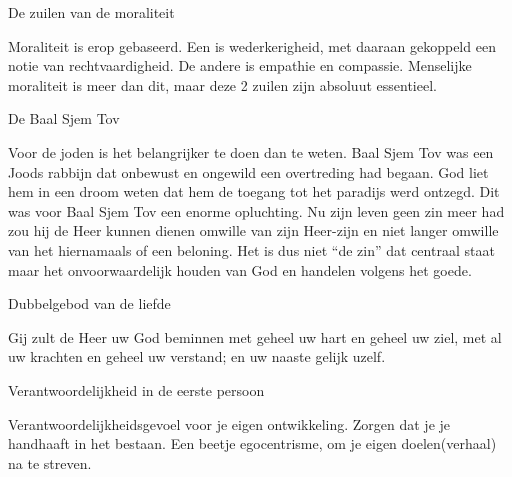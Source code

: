 \documentclass[main.tex]{subfiles}
\begin{document}
\begin{examenvraag}
    \begin{vraag}
        De zuilen van de moraliteit
    \end{vraag}

    \begin{antwoord}
		Moraliteit is erop gebaseerd.
		Een is wederkerigheid, met daaraan gekoppeld een notie van rechtvaardigheid. 
		De andere is empathie en compassie. 
		Menselijke moraliteit is meer dan dit, maar deze 2 zuilen zijn absoluut essentieel.
    \end{antwoord}
\end{examenvraag}


\begin{examenvraag}
    \begin{vraag}
        De Baal Sjem Tov
    \end{vraag}

    \begin{antwoord}
        Voor de joden is het belangrijker te doen dan te weten.‭ ‬Baal Sjem Tov was een Joods rabbijn 
        dat‭ ‬onbewust en ongewild een overtreding had begaan.‭ ‬God liet hem in een droom weten dat‭ 
        ‬hem de toegang tot het paradijs werd ontzegd.‭ ‬Dit was voor Baal Sjem Tov een enorme 
        opluchting.‭ ‬Nu zijn leven geen zin meer had zou hij de Heer kunnen dienen omwille van zijn 
        Heer-zijn en niet langer omwille van het hiernamaals of een beloning.‭ ‬Het is dus‭ ‬niet‭ “‬de 
        zin‭”‬ dat centraal staat maar het onvoorwaardelijk houden van God en handelen volgens het 
        goede.
    \end{antwoord}
\end{examenvraag}


\begin{examenvraag}
    \begin{vraag}
        Dubbelgebod van de liefde
    \end{vraag}

    \begin{antwoord}
        Gij zult de Heer uw God beminnen met geheel uw hart en geheel uw ziel, 
        met al uw krachten en geheel uw verstand; 
        en uw naaste gelijk uzelf.
    \end{antwoord}
\end{examenvraag}


\begin{examenvraag}
    \begin{vraag}
        Verantwoordelijkheid in de eerste persoon
    \end{vraag}

    \begin{antwoord}
        Verantwoordelijkheidsgevoel voor je eigen ontwikkeling.
        Zorgen dat je je handhaaft in het bestaan.
        Een beetje egocentrisme, om je eigen doelen(verhaal) na te streven.
    \end{antwoord}
\end{examenvraag}
\end{document}
